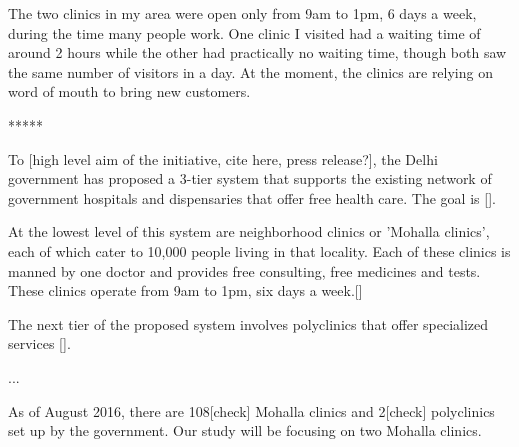 The two clinics in my area were open only from 9am to 1pm, 6 days a week, during the time many people work. One clinic I visited had a waiting time of around 2 hours while the other had practically no waiting time, though both saw the same number of visitors in a day. At the moment, the clinics are relying on word of mouth to bring new customers. 

*****

To [high level aim of the initiative, cite here, press release?], the Delhi government has proposed a 3-tier system that supports the existing network of government hospitals and dispensaries that offer free health care. The goal is [].

At the lowest level of this system are neighborhood clinics or 'Mohalla clinics', each of which cater to 10,000 people living in that locality. Each of these clinics is manned by one doctor and provides free consulting, free medicines and tests. These clinics operate from 9am to 1pm, six days a week.[]

The next tier of the proposed system involves polyclinics that offer specialized services [].

...

As of August 2016, there are 108[check] Mohalla clinics and 2[check] polyclinics set up by the government. Our study will be focusing on two Mohalla clinics. 